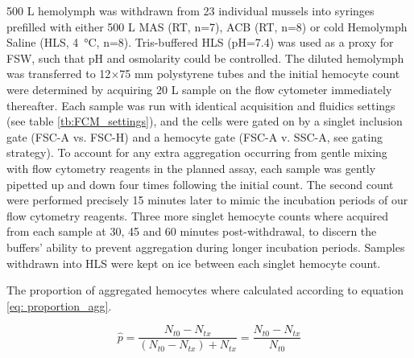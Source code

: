 500 \micro L hemolymph was withdrawn from 23 individual mussels into syringes prefilled with either 500 \micro L MAS (RT, n=7), ACB (RT, n=8) or cold Hemolymph Saline (HLS, \SI{4}{\celsius}, n=8). Tris-buffered HLS (pH=7.4) was used as a proxy for FSW, such that pH and osmolarity could be controlled. The diluted hemolymph was transferred to 12$\times$75 mm polystyrene tubes and the initial hemocyte count were determined by acquiring 20 \micro L sample on the flow cytometer immediately thereafter. Each sample was run with identical acquisition and fluidics settings (see table \ref{tb:FCM_settings}), and the cells were gated on by a singlet inclusion gate (FSC-A vs. FSC-H) and a hemocyte gate (FSC-A v. SSC-A, see gating strategy). To account for any extra aggregation occurring from gentle mixing with flow cytometry reagents in the planned assay, each sample was gently pipetted up and down four times following the initial count. The second count were performed precisely 15 minutes later to mimic the incubation periods of our flow cytometry reagents. Three more singlet hemocyte counts where acquired from each sample at 30, 45 and 60 minutes post-withdrawal, to discern the buffers' ability to prevent aggregation during longer incubation periods. Samples withdrawn into HLS were kept on ice between each singlet hemocyte count.

The proportion of aggregated hemocytes where calculated according to equation \ref{eq: proportion_agg}.

\begin{equation}
    \label{eq: proportion_agg}
    \hat{p} = \dfrac{N_{t0} - N_{tx}}{(N_{t0} - N_{tx}) + N_{tx}} = \dfrac{N_{t0} - N_{tx}}{N_{t0}}
\end{equation}

